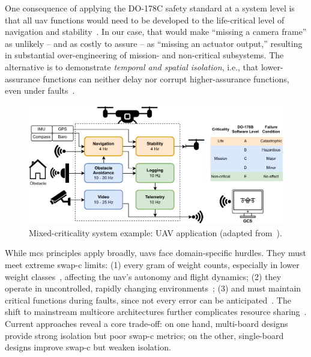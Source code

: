 One consequence of applying the DO-178C safety standard at a system level is that all \gls{uav}
functions would need to be developed to the life-critical level of navigation
and stability~\cite{youn_software_2015,davis_mixed_2018}. In our case, that
would make “missing a camera frame” as unlikely -- and as costly to assure -- as
“missing an actuator output,” resulting in substantial over-engineering of
mission- and non-critical subsystems. The alternative is to demonstrate
\emph{temporal and spatial isolation}, i.e., that lower-assurance functions can
neither delay nor corrupt higher-assurance functions, even under
faults~\cite{cinque2022virtualizing,davis_mixed_2018}.

\begin{figure}[!hbt]
  \centering
  \includegraphics[width=1.0\textwidth]{./img/pdf/mcs-example}
  \caption[Mixed-criticality system example: UAV application]{Mixed-criticality system example: UAV application (adapted from~\cite{yip_relaxing_2014}).}%
  \label{fig:mcs-example}
\end{figure}

While \gls{mcs} principles apply broadly, \glspl{uav} face domain-specific
hurdles. They must meet extreme \gls{swap-c} limits: (1) every gram of weight
counts, especially in lower weight classes~\cite{alladi2022UAVBlockain}, affecting the \gls{uav}'s autonomy
and flight dynamics; (2) they operate in uncontrolled,
rapidly changing environments~\cite{faical_adaptive_2017}; (3) and must maintain critical functions during faults, since not every error can be
anticipated~\cite{mohsan2022towards}.
The
shift to mainstream multicore architectures further complicates resource
sharing~\cite{burns2022mixed}. Current approaches reveal a core trade-off: on
one hand, multi-board designs provide strong isolation but poor \gls{swap-c}
metrics; on the other, single-board designs improve \gls{swap-c} but weaken isolation.

